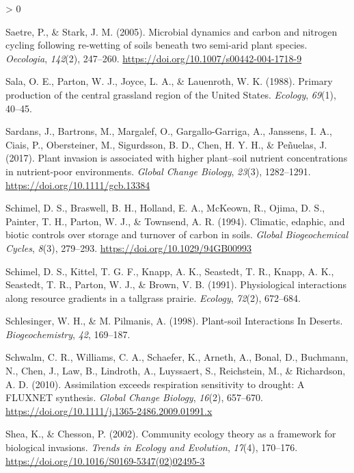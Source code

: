 \documentclass[
  11pt,
  a4paper,
]{article}
\newlength{\cslhangindent}
\newenvironment{CSLReferences}[2] %
 {%
  \setlength{\parindent}{0pt}
  \ifodd #1 \everypar{\setlength{\hangindent}{\cslhangindent}}\ignorespaces\fi
  \ifnum #2 > 0
  \setlength{\parskip}{#2\baselineskip}
  \fi
 }%
 {}
\begin{document}
\begin{CSLReferences}{1}{0}
\leavevmode\hypertarget{ref-Saetre2005}{}%
Saetre, P., \& Stark, J. M. (2005). {Microbial dynamics and carbon and nitrogen cycling following re-wetting of soils beneath two semi-arid plant species}. \emph{Oecologia}, \emph{142}(2), 247--260. \url{https://doi.org/10.1007/s00442-004-1718-9}

\leavevmode\hypertarget{ref-Sala1988}{}%
Sala, O. E., Parton, W. J., Joyce, L. A., \& Lauenroth, W. K. (1988). {Primary production of the central grassland region of the United States}. \emph{Ecology}, \emph{69}(1), 40--45.

\leavevmode\hypertarget{ref-Sardans2017}{}%
Sardans, J., Bartrons, M., Margalef, O., Gargallo-Garriga, A., Janssens, I. A., Ciais, P., Obersteiner, M., Sigurdsson, B. D., Chen, H. Y. H., \& Peñuelas, J. (2017). {Plant invasion is associated with higher plant--soil nutrient concentrations in nutrient-poor environments}. \emph{Global Change Biology}, \emph{23}(3), 1282--1291. \url{https://doi.org/10.1111/gcb.13384}

\leavevmode\hypertarget{ref-Schimel1994}{}%
Schimel, D. S., Braswell, B. H., Holland, E. A., McKeown, R., Ojima, D. S., Painter, T. H., Parton, W. J., \& Townsend, A. R. (1994). {Climatic, edaphic, and biotic controls over storage and turnover of carbon in soils}. \emph{Global Biogeochemical Cycles}, \emph{8}(3), 279--293. \url{https://doi.org/10.1029/94GB00993}

\leavevmode\hypertarget{ref-Schimel1991}{}%
Schimel, D. S., Kittel, T. G. F., Knapp, A. K., Seastedt, T. R., Knapp, A. K., Seastedt, T. R., Parton, W. J., \& Brown, V. B. (1991). {Physiological interactions along resource gradients in a tallgrass prairie}. \emph{Ecology}, \emph{72}(2), 672--684.

\leavevmode\hypertarget{ref-Schlesinger1998}{}%
Schlesinger, W. H., \& M. Pilmanis, A. (1998). {Plant-soil Interactions In Deserts}. \emph{Biogeochemistry}, \emph{42}, 169--187.

\leavevmode\hypertarget{ref-Schwalm2010}{}%
Schwalm, C. R., Williams, C. A., Schaefer, K., Arneth, A., Bonal, D., Buchmann, N., Chen, J., Law, B., Lindroth, A., Luyssaert, S., Reichstein, M., \& Richardson, A. D. (2010). {Assimilation exceeds respiration sensitivity to drought: A FLUXNET synthesis}. \emph{Global Change Biology}, \emph{16}(2), 657--670. \url{https://doi.org/10.1111/j.1365-2486.2009.01991.x}

\leavevmode\hypertarget{ref-Shea2002}{}%
Shea, K., \& Chesson, P. (2002). {Community ecology theory as a framework for biological invasions}. \emph{Trends in Ecology and Evolution}, \emph{17}(4), 170--176. \url{https://doi.org/10.1016/S0169-5347(02)02495-3}


\end{CSLReferences}
\end{document}
